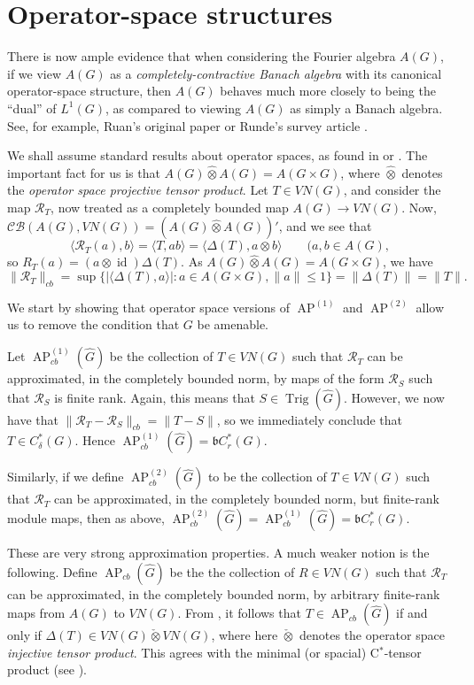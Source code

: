 \documentclass[twoside,a4paper]{article}
\theoremstyle{definition}
\theoremstyle{remark}
\newcommand{\ap}{{\operatorname{AP}}}
\newcommand{\Trig}{{\operatorname{Trig}}}
\newcommand{\inten}{\check\otimes}
\newcommand{\mc}{\mathcal}
\newcommand{\mf}{\mathfrak}
\newcommand{\id}{\operatorname{id}}
\newcommand{\ip}[2]{\langle{#1},{#2}\rangle}
\newcommand{\proten}{{\widehat{\otimes}}}
\begin{document}
\section{Operator-space structures}

There is now ample evidence that when considering the Fourier algebra $A(G)$, if we view
$A(G)$ as a \emph{completely-contractive Banach algebra} with its canonical operator-space
structure, then $A(G)$ behaves much more closely to being the ``dual'' of $L^1(G)$, as compared
to viewing $A(G)$ as simply a Banach algebra.  See, for example, Ruan's original paper
\cite{ruan} or Runde's survey article \cite{runde1}.

We shall assume standard results about operator spaces, as found in \cite{ER} or \cite{pisier}.
The important fact for us is that $A(G) \proten A(G) = A(G\times G)$, where $\proten$ denotes
the \emph{operator space projective tensor product}.  Let $T\in VN(G)$, and consider the
map $\mc R_T$, now treated as a completely bounded map $A(G)\rightarrow VN(G)$.  Now,
$\mc{CB}(A(G),VN(G)) = (A(G)\proten A(G))'$, and we see that
\[ \ip{\mc R_T(a)}{b} = \ip{T}{ab} = \ip{\Delta(T)}{a\otimes b} \qquad(a,b\in A(G), \]
so $R_T(a) = (a\otimes\id)\Delta(T)$.  As $A(G)\proten A(G) = A(G\times G)$, we have
\[ \|\mc R_T\|_{cb} = \sup\{ |\ip{\Delta(T)}{a}| : a\in A(G\times G), \|a\|\leq 1 \}
= \|\Delta(T)\| = \|T\|. \]

We start by showing that operator space versions of $\ap^{(1)}$ and $\ap^{(2)}$ allow us to
remove the condition that $G$ be amenable.

Let $\ap^{(1)}_{cb}(\hat G)$ be the collection of $T\in VN(G)$ such that $\mc R_T$ can be
approximated, in the completely bounded norm, by maps of the form $\mc R_S$ such that
$\mc R_S$ is finite rank.  Again, this means that $S\in\Trig(\hat G)$.  However, we now have
that $\|\mc R_T-\mc R_S\|_{cb} = \|T-S\|$, so we immediately conclude that $T\in C^*_\delta(G)$.
Hence $\ap^{(1)}_{cb}(\hat G) = \mf bC^*_r(G)$.

Similarly, if we define $\ap^{(2)}_{cb}(\hat G)$ to be the collection of $T\in VN(G)$ such
that $\mc R_T$ can be approximated, in the completely bounded norm, but finite-rank module
maps, then as above, $\ap^{(2)}_{cb}(\hat G) = \ap^{(1)}_{cb}(\hat G) = \mf bC^*_r(G)$.

These are very strong approximation properties.  A much weaker notion is the following.
Define $\ap_{cb}(\hat G)$ be the the collection of $R\in VN(G)$ such that $\mc R_T$ can
be approximated, in the completely bounded norm, by arbitrary finite-rank maps from $A(G)$ to
$VN(G)$.  From \cite[Proposition~8.1.2]{ER}, it follows that $T\in\ap_{cb}(\hat G)$ if and
only if $\Delta(T) \in VN(G) \inten VN(G)$, where here $\inten$ denotes the operator space
\emph{injective tensor product}.  This agrees with the minimal (or spacial) C$^*$-tensor
product (see \cite[Proposition~8.1.6]{ER}).
\end{document}
